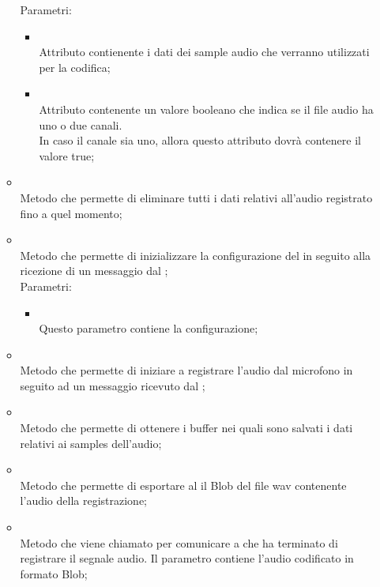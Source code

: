 \begin{itemize}
\begin{itemize}
		Parametri:
		\begin{itemize}
			\item {} \\
			Attributo contienente i dati dei sample audio che verranno utilizzati per la codifica;
			\item {} \\
			Attributo contenente un valore booleano che indica se il file audio ha uno o due canali. \\
In caso il canale sia uno, allora questo attributo dovrà contenere il valore true;
		\end{itemize}
		\item[]  \\		Metodo che permette di eliminare tutti i dati relativi all'audio registrato fino a quel momento;\\
		\item[]  \\		Metodo che permette di inizializzare la configurazione del  in seguito alla ricezione di un messaggio dal ;\\
		Parametri:
		\begin{itemize}
			\item {} \\
			Questo parametro contiene la configurazione;
		\end{itemize}
		\item[]  \\		Metodo che permette di iniziare a registrare l'audio dal microfono in seguito ad un messaggio ricevuto dal ;\\
		\item[]  \\		Metodo che permette di ottenere i buffer nei quali sono salvati i dati relativi ai samples dell'audio;\\
		\item[]  \\		Metodo che permette di esportare al  il Blob del file wav contenente l'audio della registrazione;\\
		\item[]  \\		Metodo che viene chiamato per comunicare a  che ha terminato di registrare il segnale audio. Il parametro contiene l'audio codificato in formato Blob;\\

\end{itemize}
\end{itemize}
